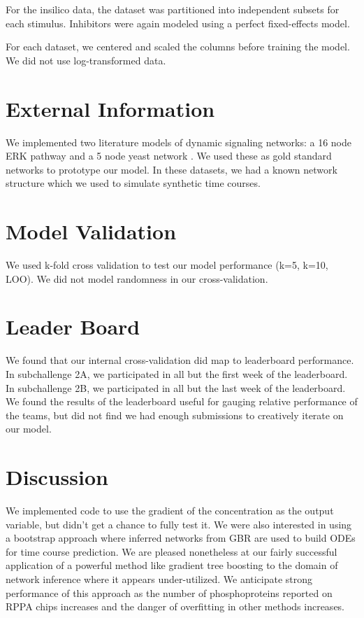 \documentclass[letterpaper, 11pt]{article}
\begin{document}
For the insilico data, the dataset was partitioned into independent subsets for each stimulus. Inhibitors were again modeled using a perfect fixed-effects model.

For each dataset, we centered and scaled the columns before training the model. We did not use log-transformed data.

\section{External Information}

We implemented two literature models of dynamic signaling networks: a 16 node ERK pathway \citep{Xu2010} and a 5 node yeast network \citep{Cantone2009}. We used these as gold standard networks to prototype our model. In these datasets, we had a known network structure which  we used to simulate synthetic time courses.

\section{Model Validation}

We used k-fold cross validation to test our model performance (k=5, k=10, LOO). We did not model randomness in our cross-validation.

\section{Leader Board}

We found that our internal cross-validation did map to leaderboard performance. In subchallenge 2A, we participated in all but the first week of the leaderboard. In subchallenge 2B, we participated in all but the last week of the leaderboard. We found the results of the leaderboard useful for gauging relative performance of the teams, but did not find we had enough submissions to creatively iterate on our model.

\section{Discussion}

We implemented code to use the gradient of the concentration as the output variable, but didn't get a chance to fully test it. We were also interested in using a bootstrap approach where inferred networks from GBR are used to build ODEs for time course prediction. We are pleased nonetheless at our fairly successful application of a powerful method like gradient tree boosting to the domain of network inference where it appears under-utilized.  We anticipate strong performance of this approach as the number of phosphoproteins reported on RPPA chips increases and the danger of overfitting in other methods increases.
\end{document}
